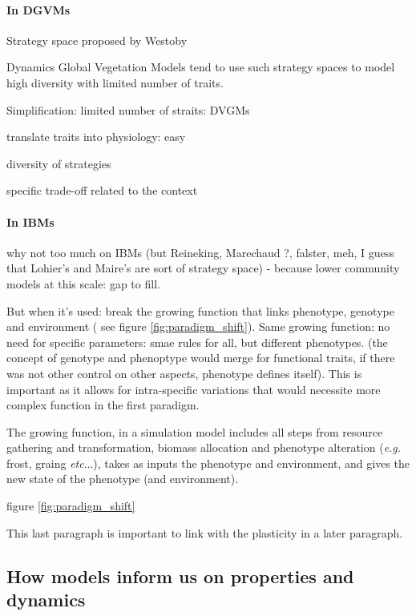 \paragraph{In DGVMs}

Strategy space proposed by Westoby 

Dynamics Global Vegetation Models tend to use such strategy spaces to model high diversity with limited number of traits. 

Simplification: limited number of straits: DVGMs

translate traits into physiology: easy

diversity of strategies

specific trade-off related to the context \parencite{scheiter_impacts_2009}

\paragraph{In IBMs}

why not too much on IBMs (but Reineking, Marechaud ?, falster, meh, I guess that Lohier's and Maire's are sort of strategy space) - because lower community models at this scale: gap to fill.

But when it's used: break the growing function that links phenotype, genotype and environment ( see figure \ref{fig:paradigm_shift}). Same growing function: no need for specific parameters: smae rules for all, but different phenotypes. (the concept of genotype and phenoptype would merge for functional traits, if there was not other control on other aspects, phenotype defines itself). This is important as it allows for intra-specific variations that would necessite more complex function in the first paradigm. 

The growing function, in a simulation model includes all steps from resource gathering and transformation, biomass allocation and phenotype alteration (\textit{e.g.} frost, graing \textit{etc}...), takes as inputs the phenotype and environment, and gives the new state of the phenotype (and environment). 

 figure \ref{fig:paradigm_shift}

This last paragraph is important to link with the plasticity in a later paragraph.


\subsection{How models inform us on properties and dynamics}

